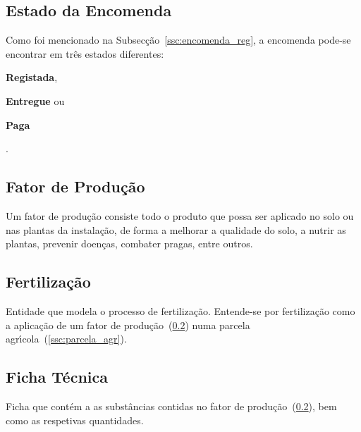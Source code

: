 \documentclass[12pt, a4paper]{article}
\begin{document}

\subsection{Estado da Encomenda}\label{ssc:encomenda_state}

Como foi mencionado na Subsec\c{c}\~ao~\ref{ssc:encomenda_reg}, a encomenda pode-se
encontrar em tr\^es estados diferentes:
\begin{enumerate*}[label = (\roman*)]
    \item \textbf{Registada},
    \item \textbf{Entregue}
        ou
    \item \textbf{Paga}
\end{enumerate*}.



\subsection{Fator de Produ\c{c}\~ao}\label{ssc:fator_prod}

Um fator de produ\c{c}\~ao consiste todo o produto que possa ser aplicado no solo ou nas
plantas da instala\c{c}\~ao, de forma a melhorar a qualidade do solo, a nutrir as plantas,
prevenir doen\c{c}as, combater pragas, entre outros.


\subsection{Fertiliza\c{c}\~ao}\label{ssc:fert}

Entidade que modela o processo de fertiliza\c{c}\~ao. Entende-se por fertiliza\c{c}\~ao
como a aplica\c{c}\~ao de um fator de produ\c{c}\~ao~(\ref{ssc:fator_prod}) numa
parcela agr\'{\i}cola~(\ref{ssc:parcela_agr}).


\subsection{Ficha T\'ecnica}\label{ssc:ficha}

Ficha que cont\'em a as subst\^ancias contidas no
fator de produ\c{c}\~ao~(\ref{ssc:fator_prod}), bem como as respetivas quantidades.
\end{document}
